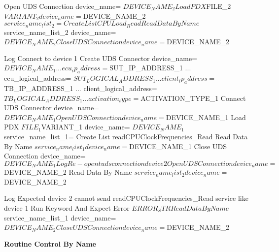 \begin{robotcode}
    Open UDS Connection    device_name= ${DEVICE_NAME_2}
    Load PDX    ${FILE_2}    ${VARIANT_2}    device_name= ${DEVICE_NAME_2}
    ${service_name_list_2}=    Create List    CPULoad_Read
    Read Data By Name    ${service_name_list_2}    device_name= ${DEVICE_NAME_2}
    Close UDS Connection    device_name= ${DEVICE_NAME_2}

    Log    Connect to device 1
    Create UDS Connector    device_name= ${DEVICE_NAME_1}
    ...                     ecu_ip_address= ${SUT_IP_ADDRESS_1}
    ...                     ecu_logical_address= ${SUT_LOGICAL_ADDRESS_1}
    ...                     client_ip_address= ${TB_IP_ADDRESS_1}
    ...                     client_logical_address= ${TB_LOGICAL_ADDRESS_1}
    ...                     activation_type= ${ACTIVATION_TYPE_1}
    Connect UDS Connector    device_name= ${DEVICE_NAME_1}

    Open UDS Connection    device_name= ${DEVICE_NAME_1}
    Load PDX    ${FILE_1}    ${VARIANT_1}    device_name= ${DEVICE_NAME_1}
    ${service_name_list_1}=    Create List    readCPUClockFrequencies_Read
    Read Data By Name    ${service_name_list_1}    device_name= ${DEVICE_NAME_1}
    Close UDS Connection    device_name= ${DEVICE_NAME_1}


    Log    Re-opent uds connection device 2
    Open UDS Connection    device_name= ${DEVICE_NAME_2}
    Read Data By Name    ${service_name_list_2}    device_name= ${DEVICE_NAME_2}

    Log    Expected device 2 cannot send readCPUClockFrequencies_Read service like device 1
    Run Keyword And Expect Error    ${ERROR_STR}    Read Data By Name    ${service_name_list_1}    device_name= ${DEVICE_NAME_2}
    Close UDS Connection    device_name= ${DEVICE_NAME_2}
\end{robotcode}

\textbf{Routine Control By Name}

